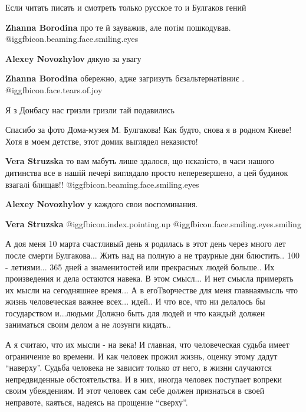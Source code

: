 \begin{itemize}
Если читать писать и смотреть только русское то и Булгаков гений

\begin{itemize} %
\textbf{Zhanna Borodina} про те й зауважив, але потім пошкодував. @igg{fbicon.beaming.face.smiling.eyes} 

\textbf{Alexey Novozhylov} дякую за увагу

\textbf{Zhanna Borodina} обережно, адже загризуть бєзальтернатівниє .  @igg{fbicon.face.tears.of.joy} 

Я з Донбасу нас гризли гризли тай подавились
\end{itemize} %


Спасибо за фото Дома-музея М. Булгакова! Как будто, снова я в родном Киеве!
Хотя в моем детстве, этот домик выглядел неказисто!

\begin{itemize} %
\textbf{Vera Struzska} то вам мабуть лише здалося, що нєказісто, в часи нашого дитинства все в нашій печері виглядало просто неперевершено, а цей будинок взагалі блищав!!  @igg{fbicon.beaming.face.smiling.eyes} 

\textbf{Alexey Novozhylov} у каждого свои воспоминания.

\textbf{Vera Struzska} @igg{fbicon.index.pointing.up} @igg{fbicon.face.smiling.eyes.smiling} 
\end{itemize} %


А доя меня 10 марта счастливый день я родилась в этот день через много лет
после смерти Булгакова... Жить над на полную а не траурные дни блюстить.. 100 -
летиями... 365 дней а знаменитостей или прекрасных людей больше.. Их
произведения и дела остаются навека. В этом смысл... И нет смысла примерять их
мысли на сегодняшнее время... А в егоТворчестве для меня главнаямысль что жизнь
человеческая важнее всех... идей.. И что все, что ни делалось бы государством
и...людьми Должно быть для людей и что каждый должен заниматься своим делом а
не лозунги кидать..

\begin{itemize} %

А я считаю, что их мысли - на века! И главная, что человеческая судьба имеет
ограничение во времени. И как человек прожил жизнь, оценку этому дадут
\enquote{наверху}. Судьба человека не зависит только от него, в жизни случаются
непредвиденные обстоятельства. И в них, иногда человек поступает вопреки своим
убеждениям. И этот человек сам себе должен признаться в своей неправоте,
каяться, надеясь на прощение \enquote{сверху}.


\end{itemize}
\end{itemize}
